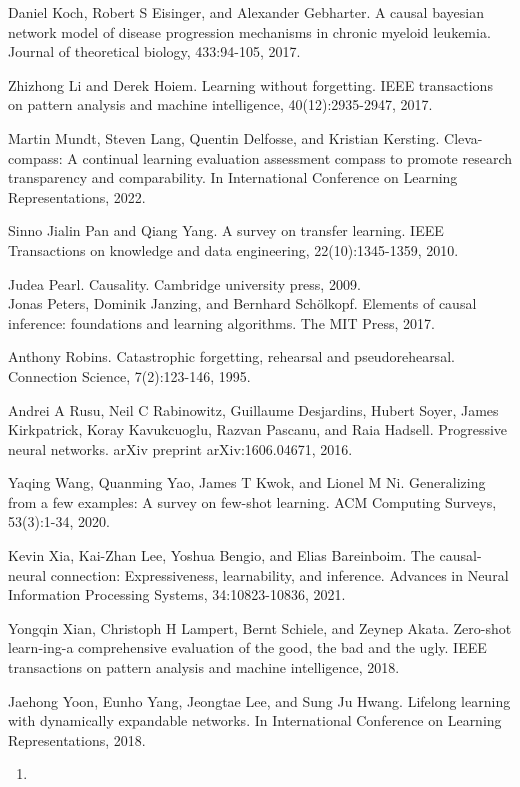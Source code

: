 \documentclass[10pt]{article}
\begin{document}
Daniel Koch, Robert S Eisinger, and Alexander Gebharter. A causal bayesian network model of disease progression mechanisms in chronic myeloid leukemia. Journal of theoretical biology, 433:94-105, 2017.

Zhizhong Li and Derek Hoiem. Learning without forgetting. IEEE transactions on pattern analysis and machine intelligence, 40(12):2935-2947, 2017.

Martin Mundt, Steven Lang, Quentin Delfosse, and Kristian Kersting. Cleva-compass: A continual learning evaluation assessment compass to promote research transparency and comparability. In International Conference on Learning Representations, 2022.

Sinno Jialin Pan and Qiang Yang. A survey on transfer learning. IEEE Transactions on knowledge and data engineering, 22(10):1345-1359, 2010.

Judea Pearl. Causality. Cambridge university press, 2009.\\
Jonas Peters, Dominik Janzing, and Bernhard Schölkopf. Elements of causal inference: foundations and learning algorithms. The MIT Press, 2017.

Anthony Robins. Catastrophic forgetting, rehearsal and pseudorehearsal. Connection Science, 7(2):123-146, 1995.

Andrei A Rusu, Neil C Rabinowitz, Guillaume Desjardins, Hubert Soyer, James Kirkpatrick, Koray Kavukcuoglu, Razvan Pascanu, and Raia Hadsell. Progressive neural networks. arXiv preprint arXiv:1606.04671, 2016.

Yaqing Wang, Quanming Yao, James T Kwok, and Lionel M Ni. Generalizing from a few examples: A survey on few-shot learning. ACM Computing Surveys, 53(3):1-34, 2020.

Kevin Xia, Kai-Zhan Lee, Yoshua Bengio, and Elias Bareinboim. The causal-neural connection: Expressiveness, learnability, and inference. Advances in Neural Information Processing Systems, 34:10823-10836, 2021.

Yongqin Xian, Christoph H Lampert, Bernt Schiele, and Zeynep Akata. Zero-shot learn-ing-a comprehensive evaluation of the good, the bad and the ugly. IEEE transactions on pattern analysis and machine intelligence, 2018.

Jaehong Yoon, Eunho Yang, Jeongtae Lee, and Sung Ju Hwang. Lifelong learning with dynamically expandable networks. In International Conference on Learning Representations, 2018.

\begin{enumerate}
  \item 
\end{enumerate}
\end{document}
